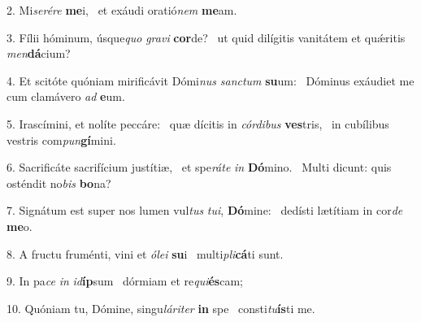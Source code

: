 2. Mi\textit{se}\textit{ré}\textit{re} \textbf{me}i, \ast\  et exáudi oratió\textit{nem} \textbf{me}am.\

3. Fílii hóminum, úsque\textit{quo} \textit{gra}\textit{vi} \textbf{cor}de? \ast\  ut quid dilígitis vanitátem et quǽritis \textit{men}\textbf{dá}cium?\

4. Et scitóte quóniam mirificávit Dómi\textit{nus} \textit{sanc}\textit{tum} \textbf{su}um: \ast\  Dóminus exáudiet me cum clamávero \textit{ad} \textbf{e}um.\

5. Irascímini, et nolíte peccáre: \dag\  quæ dícitis in \textit{cór}\textit{di}\textit{bus} \textbf{ves}tris, \ast\  in cubílibus vestris com\textit{pun}\textbf{gí}mini.\

6. Sacrificáte sacrifícium justítiæ, \dag\  et spe\textit{rá}\textit{te} \textit{in} \textbf{Dó}mino. \ast\  Multi dicunt: quis osténdit no\textit{bis} \textbf{bo}na?\

7. Signátum est super nos lumen vul\textit{tus} \textit{tu}\textit{i}, \textbf{Dó}mine: \ast\  dedísti lætítiam in cor\textit{de} \textbf{me}o.\

8. A fructu fruménti, vini et \textit{ó}\textit{le}\textit{i} \textbf{su}i \ast\  multi\textit{pli}\textbf{cá}ti sunt.\

9. In pa\textit{ce} \textit{in} \textit{id}\textbf{íp}sum \ast\  dórmiam et re\textit{qui}\textbf{és}cam;\

10. Quóniam tu, Dómine, singu\textit{lá}\textit{ri}\textit{ter} \textbf{in} spe \ast\  consti\textit{tu}\textbf{ís}ti me.\

